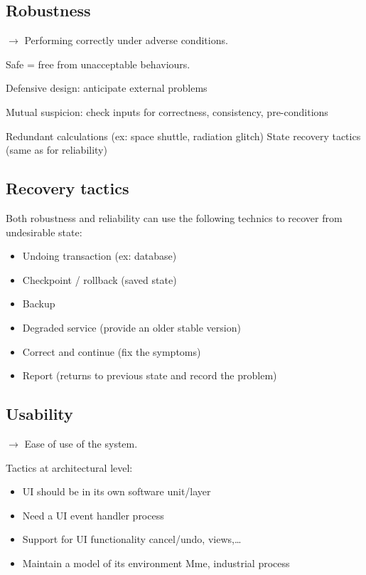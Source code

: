 \subsection{Robustness}

$\rightarrow$ Performing correctly under adverse conditions.

Safe = free from unacceptable behaviours.

Defensive design: anticipate external problems

Mutual suspicion: check inputs for correctness, consistency, pre-conditions

Redundant calculations (ex: space shuttle, radiation glitch)
State recovery tactics (same as for reliability)

\subsection{Recovery tactics}

Both robustness and reliability can use the following technics to recover from undesirable
state:

\begin{itemize}
    \item Undoing transaction (ex: database)
    \item Checkpoint / rollback (saved state)
    \item Backup
    \item Degraded service (provide an older stable version)
    \item Correct and continue (fix the symptoms)
    \item Report (returns to previous state and record the problem)
\end{itemize}

\subsection{Usability}
$\rightarrow$ Ease of use of the system.

Tactics at architectural level:
\begin{itemize}
    \item UI should be in its own software unit/layer
    \item Need a UI event handler process
    \item Support for UI functionality cancel/undo, views,\ldots
    \item Maintain a model of its environment Mme, industrial process
\end{itemize}
